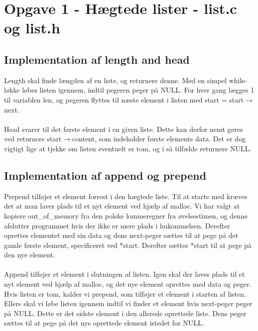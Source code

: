 \documentclass[10pt,a4paper,danish]{article}
\title{}
\author{Maria Caroline Miller, 040779, twq135 \\ Søren Pilgård, 190689, vpb984}
\begin{document}
\maketitle
\newpage

\tableofcontents
\newpage

\section{Opgave 1 - Hægtede lister - list.c og list.h}

\subsection{Implementation af length and head}
Length skal finde længden af en liste, og returnere denne. Med en simpel while-løkke løbes listen igennem, indtil pegeren peger på NULL. For hver gang lægges 1 til variablen len, og pegeren flyttes til næste element i listen med start = start$\rightarrow$next.\\
\\
Head svarer til det første element i en given liste. Dette kan derfor nemt gøres ved returnere start$\rightarrow$content, som indeholder første elements data. Det er dog vigtigt lige at tjekke om listen eventuelt er tom, og i så tilfælde returnere NULL.

\subsection{Implementation af append og prepend}
Prepend tilføjer et element forrest i den hægtede liste. Til at starte med kræves det at man laver plads til et nyt element ved hjælp af malloc. Vi har valgt at kopiere out\_of\_memory fra den polske lommeregner fra øvelsestimen, og denne afslutter programmet hvis der ikke er mere plads i hukommelsen. Derefter oprettes elementet med sin data og dens next-peger sættes til at pege på det gamle første element, specificeret ved *start. Derefter sættes *start til at pege på den nye element.\\
\\
Append tilføjer et element i slutningen af listen. Igen skal der laves plads til et nyt element ved hjælp af malloc, og det nye element oprettes med data og peger. Hvis listen er tom, kalder vi prepend, som tilføjer et element i starten af listen. Ellers skal vi løbe listen igennem indtil vi finder et element hvis next-peger peger på NULL. Dette er det sidste element i den allerede oprettede liste. Dens peger sættes til at pege på det nys oprettede element istedet for NULL.
\end{document}

